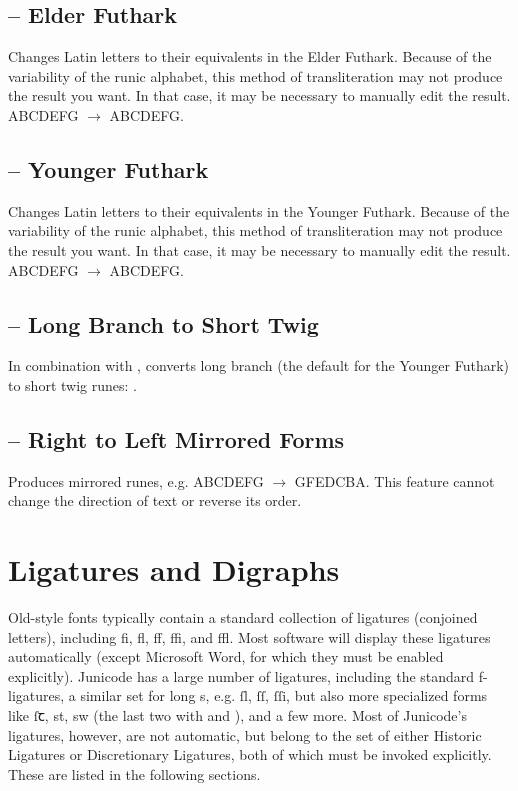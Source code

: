 \subsection{ -- Elder
Futhark}
Changes Latin letters to their equivalents in the Elder Futhark. Because of the variability of the runic alphabet, this
method of transliteration may not produce the result you want. In that case, it may be necessary to manually edit the
result. ABCDEFG $\rightarrow $ {ABCDEFG}.

\subsection{ -- Younger
Futhark}
Changes Latin letters to their equivalents in the Younger Futhark. Because of the variability of the runic alphabet,
this method of transliteration may not produce the result you want. In that case, it may be necessary to manually edit
the result. ABCDEFG $\rightarrow $ {ABCDEFG}.

\subsection{ --
Long Branch to Short Twig}
In combination with , converts long branch (the default for the Younger Futhark) to short twig runes:
{}.

\subsection{
-- Right to Left Mirrored Forms}
Produces mirrored runes, e.g. {ABCDEFG $\rightarrow $ GFEDCBA}.
This feature cannot change the direction of text or reverse its order.

\section{Ligatures and Digraphs}

Old-style fonts typically contain a standard collection of ligatures (conjoined letters), including
fi, fl, ff, ffi, and ffl. Most software will display these ligatures automatically (except
Microsoft Word, for which they must be enabled explicitly). Junicode has a large number of ligatures,
including the standard f-ligatures, a similar set for long s, e.g. ſl, ſſ, ſſi, but also more
specialized forms like ſꞇ, 
{st},
{sw}
(the last two with  and ), and a few more. Most of Junicode’s
ligatures, however, are not automatic, but belong to the set of either Historic Ligatures
or Discretionary Ligatures, both of which must be invoked explicitly. These are listed in the following sections.

